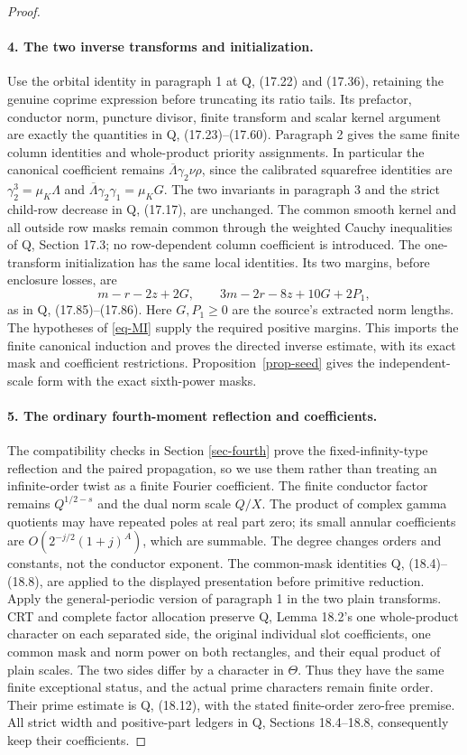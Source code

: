 \documentclass[11pt,a4paper]{article}
\theoremstyle{remark}\newtheorem{remark}[theorem]{Remark}
\numberwithin{equation}{section}
\begin{document}
\begin{proof}
\paragraph{4. The two inverse transforms and initialization.}
Use the orbital identity in paragraph 1 at Q, (17.22) and
(17.36), retaining the genuine coprime expression before
truncating its ratio tails. Its prefactor, conductor norm,
puncture divisor, finite transform and scalar kernel argument
are exactly the quantities in Q, (17.23)--(17.60).
Paragraph 2 gives the same finite column identities and
whole-product priority assignments. In particular the canonical
coefficient remains
$\overline\Lambda\gamma_2\nu\rho$, since the calibrated
squarefree identities are
$\gamma_2^3=\mu_K\Lambda$ and
$\overline\Lambda\gamma_2\gamma_1=\mu_KG$.
The two invariants in paragraph 3 and the strict child-row
decrease in Q, (17.17), are unchanged. The common smooth kernel
and all outside row masks remain common through the weighted
Cauchy inequalities of Q, Section 17.3; no row-dependent column
coefficient is introduced. The one-transform initialization has
the same local identities. Its two margins, before enclosure
losses, are
\[
 m-r-2z+2G,\qquad 3m-2r-8z+10G+2P_1,
\]
as in Q, (17.85)--(17.86). Here $G,P_1\ge0$ are the source's
extracted norm lengths. The hypotheses of \eqref{eq-MI}
supply the required positive margins. This imports the finite
canonical induction and proves the directed inverse estimate,
with its exact mask and coefficient restrictions. Proposition~\ref{prop-seed} gives the independent-scale
form with the exact sixth-power masks.

\paragraph{5. The ordinary fourth-moment reflection and coefficients.}
The compatibility checks in Section \ref{sec-fourth} prove the
fixed-infinity-type reflection and the paired propagation, so
we use them rather than treating an infinite-order twist as a
finite Fourier coefficient. The finite conductor factor remains
$Q^{1/2-s}$ and the dual norm scale $Q/X$. The product of complex
gamma quotients may have repeated poles at real part zero;
its small annular coefficients are
$O(2^{-j/2}(1+j)^A)$, which are summable. The degree changes
orders and constants, not the conductor exponent.
The common-mask identities Q, (18.4)--(18.8), are applied to
the displayed presentation before primitive reduction.
Apply the general-periodic version of paragraph 1 in the two
plain transforms. CRT and complete factor allocation preserve
Q, Lemma 18.2's one whole-product character on each separated
side, the original individual slot coefficients, one common
mask and norm power on both rectangles, and their equal product
of plain scales. The two sides differ by a character in
$\Theta$. Thus they have the same finite exceptional status,
and the actual prime characters remain finite order. Their
prime estimate is Q, (18.12), with the stated finite-order
zero-free premise. All strict width and positive-part ledgers
in Q, Sections 18.4--18.8, consequently keep their coefficients.


\end{proof}
\end{document}
